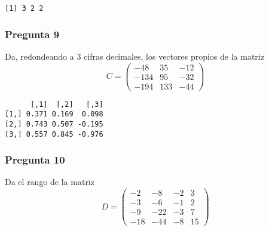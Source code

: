 \documentclass[
]{article}
\newenvironment{Shaded}{\begin{snugshade}}{\end{snugshade}}
\newcommand{\AttributeTok}[1]{\textcolor[rgb]{0.77,0.63,0.00}{#1}}
\newcommand{\ConstantTok}[1]{\textcolor[rgb]{0.00,0.00,0.00}{#1}}
\newcommand{\DecValTok}[1]{\textcolor[rgb]{0.00,0.00,0.81}{#1}}
\newcommand{\FunctionTok}[1]{\textcolor[rgb]{0.00,0.00,0.00}{#1}}
\newcommand{\NormalTok}[1]{#1}
\newcommand{\OtherTok}[1]{\textcolor[rgb]{0.56,0.35,0.01}{#1}}
\newcommand{\SpecialCharTok}[1]{\textcolor[rgb]{0.00,0.00,0.00}{#1}}
\begin{document}
\begin{verbatim}
[1] 3 2 2
\end{verbatim}

\hypertarget{pregunta-9}{%
\subsubsection{Pregunta 9}\label{pregunta-9}}

Da, redondeando a 3 cifras decimales, los vectores propios de la matriz
\[C = \begin{pmatrix} -48 & 35  & −12 \\-134 & 95 & -32 \\-194 & 133 & -44 \end{pmatrix} \]

\begin{Shaded}
\end{Shaded}

\begin{verbatim}
      [,1]  [,2]   [,3]
[1,] 0.371 0.169  0.098
[2,] 0.743 0.507 -0.195
[3,] 0.557 0.845 -0.976
\end{verbatim}

\hypertarget{pregunta-10}{%
\subsubsection{Pregunta 10}\label{pregunta-10}}

Da el rango de la matriz
\[D = \begin{pmatrix} −2 & −8 & −2 & 3 \\−3 & −6 & −1 & 2\\−9 & −22 & −3 & 7 \\ −18 & −44 & −8 & 15 \end{pmatrix} \]
\end{document}
